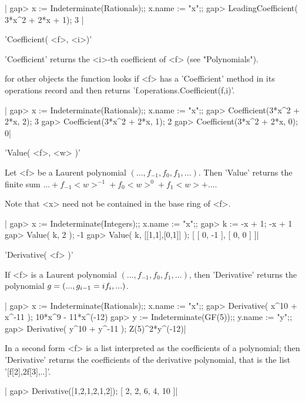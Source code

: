 |    gap> x := Indeterminate(Rationals);; x.name := "x";;
    gap> LeadingCoefficient( 3*x^2 + 2*x + 1);
    3 |


'Coefficient( <f>, <i>)'

'Coefficient' returns the <i>-th coefficient of <f> (see "Polynomials").

for  other objects the function looks if  <f> has a 'Coefficient' method in
its operations record and then returns 'f.operations.Coefficient(f,i)'.

|    gap> x := Indeterminate(Rationals);; x.name := "x";;
    gap> Coefficient(3*x^2 + 2*x, 2);
    3
    gap> Coefficient(3*x^2 + 2*x, 1);
    2
    gap> Coefficient(3*x^2 + 2*x, 0);
    0|


'Value( <f>, <w> )'

Let <f> be  a Laurent  polynomial $(..., f_{-1}, f_0,  f_1,  ...)$.  Then
'Value' returns the finite sum $... +  f_{-1} <w>^{-1} + f_0 <w>^0 +  f_1
<w> + ...$.

Note that <x> need not be contained in the base ring of <f>.

|    gap> x := Indeterminate(Integers);; x.name := "x";;
    gap> k := -x + 1;
    -x + 1
    gap> Value( k, 2 );
    -1
    gap> Value( k, [[1,1],[0,1]] );
    [ [ 0, -1 ], [ 0, 0 ] ]|



'Derivative( <f> )'

If <f> is a Laurent  polynomial $(..., f_{-1},  f_0,  f_1,  ...)$, then
'Derivative' returns the polynomial $g = (..., g_{i-1} = i\* f_i, ... )$.

|    gap> x := Indeterminate(Rationals);; x.name := "x";;
    gap> Derivative( x^10 + x^-11 );
    10*x^9 - 11*x^(-12)
    gap> y := Indeterminate(GF(5));; y.name := "y";;    
    gap> Derivative( y^10 + y^-11 );
    Z(5)^2*y^(-12)|

In a second form <f> is a list interpreted as the coefficients of a
polynomial; then 'Derivative' returns the coefficients of the derivative
polynomial, that is the list '[f[2],2\*f[3],..]'.

|    gap> Derivative([1,2,1,2,1,2]);
    [ 2, 2, 6, 4, 10 ]|



